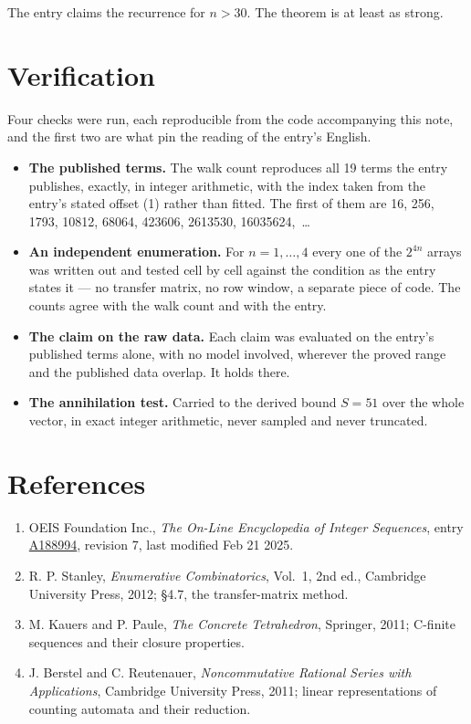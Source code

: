 \documentclass[11pt]{article}
\theoremstyle{definition}
\begin{document}
The entry claims the recurrence for $n > 30$. The theorem is at least as strong.

\section{Verification}

Four checks were run, each reproducible from the code accompanying this note, and the first two are what pin the reading of the entry's English.

\begin{itemize}

\item {\bfseries The published terms.} The walk count reproduces all 19 terms the entry publishes, exactly, in integer arithmetic, with the index taken from the entry's stated offset (1) rather than fitted. The first of them are 16, 256, 1793, 10812, 68064, 423606, 2613530, 16035624,~\dots

\item {\bfseries An independent enumeration.} For $n = 1,\dots,4$ every one of the $2^{4n}$ arrays was written out and tested cell by cell against the condition as the entry states it --- no transfer matrix, no row window, a separate piece of code. The counts agree with the walk count and with the entry.

\item {\bfseries The claim on the raw data.} Each claim was evaluated on the entry's published terms alone, with no model involved, wherever the proved range and the published data overlap. It holds there.

\item {\bfseries The annihilation test.} Carried to the derived bound $S = 51$ over the whole vector, in exact integer arithmetic, never sampled and never truncated.

\end{itemize}

\section{References}

\begin{enumerate}

\item OEIS Foundation Inc., \emph{The On-Line Encyclopedia of Integer Sequences}, entry \href{https://oeis.org/A188994}{A188994}, revision 7, last modified Feb 21 2025.

\item R. P. Stanley, \emph{Enumerative Combinatorics}, Vol.~1, 2nd ed., Cambridge University Press, 2012; \S4.7, the transfer-matrix method.

\item M. Kauers and P. Paule, \emph{The Concrete Tetrahedron}, Springer, 2011; C-finite sequences and their closure properties.

\item J. Berstel and C. Reutenauer, \emph{Noncommutative Rational Series with Applications}, Cambridge University Press, 2011; linear representations of counting automata and their reduction.

\end{enumerate}
\end{document}
